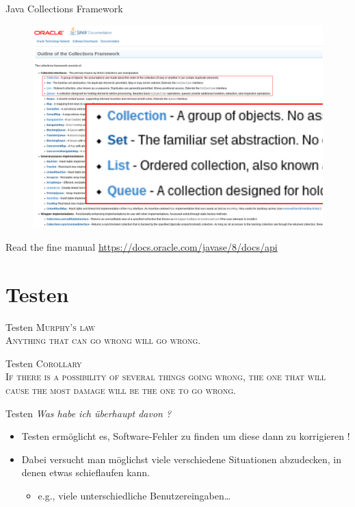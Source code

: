 \documentclass[18pt]{beamer}
\begin{document}
\begin{frame}{Java Collections Framework}
    \begin{figure}
        \includegraphics[scale=.28]{img/javacollectionsframework.png}
    \end{figure}
\end{frame}

\begin{frame}{Read the fine manual}
    \Large{\url{https://docs.oracle.com/javase/8/docs/api}}
\end{frame}



\section{Testen}

\begin{frame}{Testen}
    \textsc{\LARGE{Murphy's law}}\\
    \textsc{Anything that can go wrong will go wrong.}
\end{frame}

\begin{frame}{Testen}
    \textsc{\LARGE{Corollary}}\\
    \textsc{If there is a possibility of several things going wrong, the one that will cause the most damage will be the one to go wrong.}
\end{frame}

\begin{frame}{Testen}
    \textit{Was habe ich überhaupt davon ?}
    \begin{itemize}
        \item Testen ermöglicht es, Software-Fehler zu finden um diese dann zu korrigieren !
        \item Dabei versucht man möglichst viele verschiedene Situationen abzudecken, in denen etwas schieflaufen kann.
        \begin{itemize}
            \item e.g., viele unterschiedliche Benutzereingaben\dots
        \end{itemize}
    \end{itemize}
\end{frame}
\end{document}
